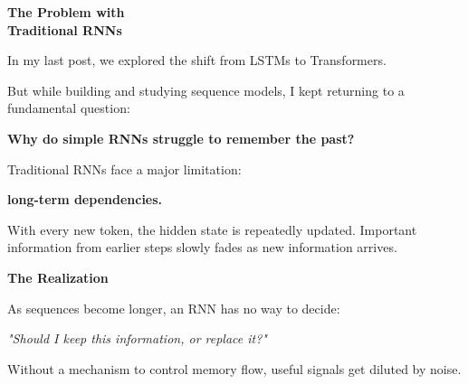 \documentclass[11pt]{article}
\begin{document}
    \begin{center}
    {\fontsize{26}{30}\selectfont\color{brandnavy}\bfseries 
    The Problem with\\Traditional RNNs}
    \end{center}
    
    \vspace{0.3in}
    
    {\large\color{brandgray}
    In my last post, we explored the shift from LSTMs to Transformers.
    }
    
    \vspace{0.15in}
    
    But while building and studying sequence models, I kept returning to a
    fundamental question:
    
    \textbf{Why do simple RNNs struggle to remember the past?}
    
    \vspace{0.15in}
    
    Traditional RNNs face a major limitation:
    
    \textbf{long-term dependencies.}
    
    \vspace{0.1in}
    
    With every new token, the hidden state is repeatedly updated. 
    Important information from earlier steps slowly fades as new information arrives.
    
    \vspace{0.15in}
    
    \begin{darkbox}
    
    {\large\textbf{The Realization}}
    
    \vspace{0.05in}
    
    As sequences become longer, an RNN has no way to decide:
    
    \begin{center}
    \textit{"Should I keep this information, or replace it?"}
    \end{center}
    
    Without a mechanism to control memory flow, useful signals get diluted by noise.
    
    \end{darkbox}
    
    \vfill
    \newpage
    
\end{document}
